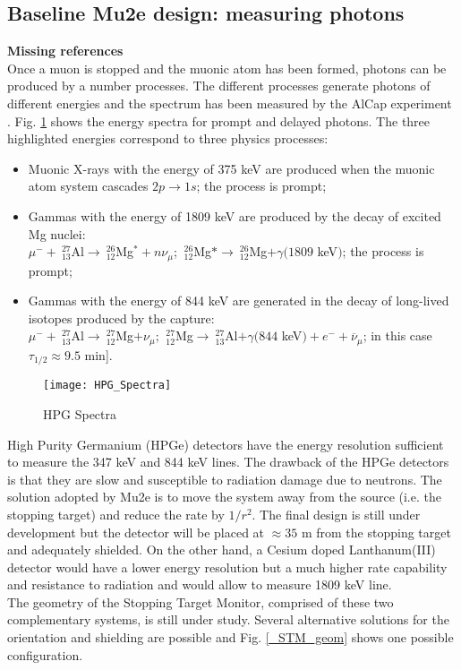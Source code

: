\documentclass[12pt,a4paper,openright, oneside, titlepage]{book} %
\begin{document}
\subsection{Baseline Mu2e design: measuring photons}
\textbf{Missing references}\\
Once a muon is stopped and the muonic atom has been formed, photons can be produced by a number processes. 
The different processes generate photons of different energies 
and the spectrum has been measured by the AlCap experiment \cite{AlCap:2015}\cite{AlCap:2020}.
Fig. \ref{_HPG_Spectra} shows the energy spectra for prompt and delayed photons.
The three highlighted energies correspond to three physics processes:
\begin{itemize}
\item Muonic X-rays with the energy of 375 keV are produced when the muonic atom system cascades $2p\rightarrow 1s$; 
the process is prompt;
\item Gammas with the energy of 1809 keV are produced by the decay of excited Mg nuclei:\\
$\mu^-+\ _{13}^{27}$Al$\rightarrow \ _{12}^{26}$Mg$^*+n\nu_\mu$; $\ _{12}^{26}$Mg$*\rightarrow \ _{12}^{26}$Mg$+\gamma(1809$ keV$)$;  the process is prompt;
\item Gammas with the energy of 844 keV are generated in the decay of long-lived isotopes produced by the capture:\\
$\mu^-+\ _{13}^{27}$Al$\rightarrow \ _{12}^{27}$Mg$+\nu_\mu$; $\ _{12}^{27}$Mg$\rightarrow \ _{13}^{27}$Al$+\gamma(844$ keV$)+e^-+\overline{\nu}_\mu$; in this case $\tau_{1/2}\approx9.5$ min].
\end{itemize}

\begin{figure}[h!]
\centering
\texttt{[image: HPG\_Spectra]}
\caption{HPG Spectra}
\label{_HPG_Spectra}
\end{figure}

\noindent
High Purity Germanium (HPGe) detectors have the energy resolution sufficient to measure the 347 keV and 844 keV lines. 
The drawback of the HPGe detectors is that they are slow and susceptible to radiation damage due to neutrons. 
The solution adopted by Mu2e is to move the system away from the source (i.e. the stopping target) and
reduce the rate by $1/r^2$. 
The final design is still under development but the detector will be placed at $\approx35$ m from the stopping target 
and adequately shielded. On the other hand, a Cesium doped Lanthanum(III) detector would have a lower energy resolution 
but a much higher rate capability and resistance to radiation and would allow to measure 1809 keV line.\\
The geometry of the Stopping Target Monitor, comprised of these two complementary systems, is still under study. 
Several alternative solutions for the orientation and shielding are possible and Fig. \ref{_STM_geom} shows one possible configuration.
\end{document}
